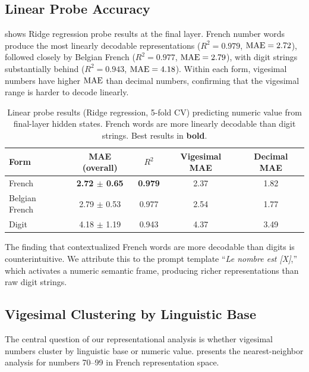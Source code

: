 \subsection{Linear Probe Accuracy}
\label{sec:results_probe}

 shows Ridge regression probe results at the final layer.
French number words produce the most linearly decodable representations ($R^2 = 0.979$, $\text{MAE} = 2.72$), followed closely by Belgian French ($R^2 = 0.977$, $\text{MAE} = 2.79$), with digit strings substantially behind ($R^2 = 0.943$, $\text{MAE} = 4.18$).
Within each form, vigesimal numbers have higher $\text{MAE}$ than decimal numbers, confirming that the vigesimal range is harder to decode linearly.

\begin{table}[t]
    \centering
    \caption{Linear probe results (Ridge regression, 5-fold CV) predicting numeric value from \mistral final-layer hidden states. French words are more linearly decodable than digit strings. Best results in \textbf{bold}.}
    \begin{tabular}{@{}lcccc@{}}
        \toprule
        \textbf{Form} & \textbf{MAE (overall)} & \textbf{$R^2$} & \textbf{Vigesimal MAE} & \textbf{Decimal MAE} \\
        \midrule
        French & \textbf{2.72 $\pm$ 0.65} & \textbf{0.979} & 2.37 & 1.82 \\
        Belgian French & 2.79 $\pm$ 0.53 & 0.977 & 2.54 & 1.77 \\
        Digit & 4.18 $\pm$ 1.19 & 0.943 & 4.37 & 3.49 \\
        \bottomrule
    \end{tabular}
    \label{tab:probe}
\end{table}

The finding that contextualized French words are more decodable than digits is counterintuitive.
We attribute this to the prompt template ``\emph{Le nombre est [X]},'' which activates a numeric semantic frame, producing richer representations than raw digit strings.

\subsection{Vigesimal Clustering by Linguistic Base}
\label{sec:results_clustering}

The central question of our representational analysis is whether vigesimal numbers cluster by linguistic base or numeric value.
 presents the nearest-neighbor analysis for numbers 70--99 in French representation space.


